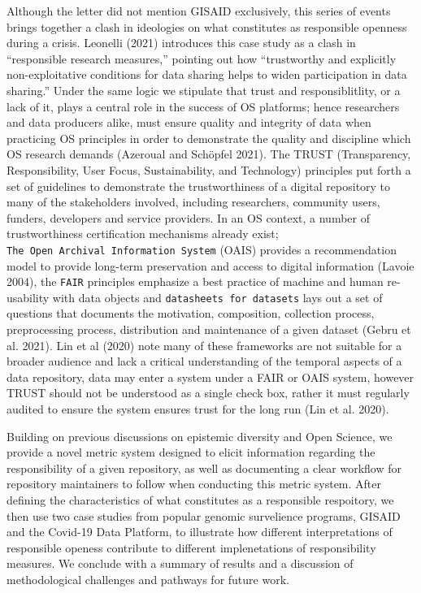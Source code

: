 \documentclass{article}
\begin{document}
Although the letter did not mention GISAID exclusively, this series of
events brings together a clash in ideologies on what constitutes as
responsible openness during a crisis. Leonelli (2021) introduces this
case study as a clash in ``responsible research measures,'' pointing out
how ``trustworthy and explicitly non-exploitative conditions for data
sharing helps to widen participation in data sharing.'' Under the same
logic we stipulate that trust and responsiblitlity, or a lack of it,
plays a central role in the success of OS platforms; hence researchers
and data producers alike, must ensure quality and integrity of data when
practicing OS principles in order to demonstrate the quality and
discipline which OS research demands (Azeroual and Schöpfel 2021). The
TRUST (Transparency, Responsibility, User Focus, Sustainability, and
Technology) principles put forth a set of guidelines to demonstrate the
trustworthiness of a digital repository to many of the stakeholders
involved, including researchers, community users, funders, developers
and service providers. In an OS context, a number of trustworthiness
certification mechanisms already exist;
\texttt{The\ Open\ Archival\ Information\ System} (OAIS) provides a
recommendation model to provide long-term preservation and access to
digital information (Lavoie 2004), the \texttt{FAIR} principles
emphasize a best practice of machine and human re-usability with data
objects and \texttt{datasheets\ for\ datasets} lays out a set of
questions that documents the motivation, composition, collection
process, preprocessing process, distribution and maintenance of a given
dataset (Gebru et al. 2021). Lin et al (2020) note many of these
frameworks are not suitable for a broader audience and lack a critical
understanding of the temporal aspects of a data repository, data may
enter a system under a FAIR or OAIS system, however TRUST should not be
understood as a single check box, rather it must regularly audited to
ensure the system ensures trust for the long run (Lin et al. 2020).

Building on previous discussions on epistemic diversity and Open
Science, we provide a novel metric system designed to elicit information
regarding the responsibility of a given repository, as well as
documenting a clear workflow for repository maintainers to follow when
conducting this metric system. After defining the characteristics of
what constitutes as a responsible respoitory, we then use two case
studies from popular genomic survelience programs, GISAID and the
Covid-19 Data Platform, to illustrate how different interpretations of
responsible openess contribute to different implenetations of
responsibility measures. We conclude with a summary of results and a
discussion of methodological challenges and pathways for future work.
\end{document}
